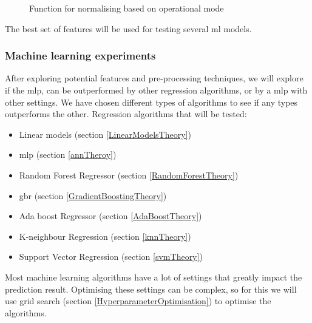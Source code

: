 \documentclass[english, a4paper]{report}
\begin{document}
{{{{                \begin{figure}[H]
                    \centering {} \inputminted{python}{thesis/Code/NormaliseByMode.py}
                    \caption{Function for normalising based on operational mode}
                    \label{fig:NormaliseByMode}
                \end{figure}
                
                The best set of features will be used for testing several \gls{ml} models.
            }
            
            \subsubsection{Machine learning experiments}\label{NASAmlExperiment}
            {
                After exploring potential features and pre-processing techniques, we will explore if the \gls{mlp}, can be outperformed by other regression algorithms, or by a \gls{mlp} with other settings. We have chosen different types of algorithms to see if any types outperforms the other. Regression algorithms that will be tested:
                
                \begin{itemize}
                    \item Linear models (section \ref{LinearModelsTheory})
                    \item \gls{mlp} (section \ref{annTheroy})
                    \item Random Forest Regressor (section \ref{RandomForestTheory})
                    \item \gls{gbr} (section \ref{GradientBoostingTheory})
                    \item Ada boost Regressor (section \ref{AdaBoostTheory})
                    \item K-neighbour Regression (section \ref{knnTheory})
                    \item Support Vector Regression (section \ref{svmTheory}) 
                \end{itemize}
                
                Most machine learning algorithms have a lot of settings that greatly impact the prediction result. Optimising these settings can be complex, so for this we will use grid search (section \ref{HyperparameterOptimisation}) to optimise the algorithms.
            }
            
}}}
\end{document}
